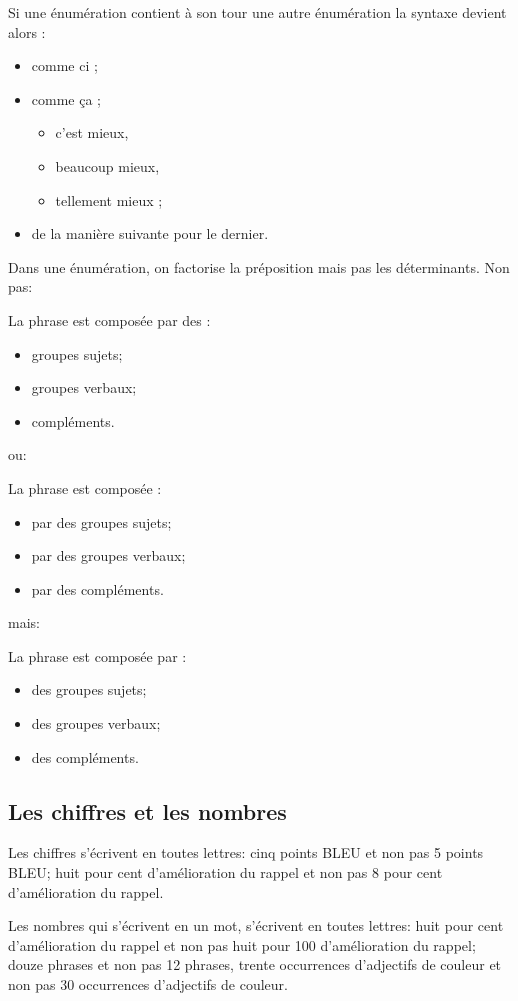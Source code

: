 \documentclass[utf8x]{article-hermes_frenchb}
\begin{document}
Si une énumération contient à son tour une autre énumération la syntaxe devient alors :
\begin{itemize}
\item comme ci ;
\item comme ça ;
    \begin{itemize}
	\item c'est mieux,
	\item beaucoup mieux,
	\item tellement mieux ;
    \end{itemize}
\item de la manière suivante pour le dernier.
\end{itemize}


Dans une énumération, on factorise la préposition mais pas les déterminants. Non pas:

La phrase est composée par des :
\begin{itemize}
\item groupes sujets;
\item groupes verbaux;
\item compléments. 
\end{itemize}

ou:

La phrase est composée :
\begin{itemize}
\item par des groupes sujets;
\item par des groupes verbaux;
\item par des compléments. 
\end{itemize}

mais:

La phrase est composée par :
\begin{itemize}
\item des groupes sujets;
\item des groupes verbaux;
\item des compléments. 
\end{itemize}

\subsection{Les chiffres et les nombres}

Les chiffres s'écrivent en toutes lettres:
cinq points BLEU
et non pas
5 points BLEU;
huit pour cent d'amélioration du rappel
et non pas
8 pour cent d'amélioration du rappel.

Les nombres qui s'écrivent en un mot, s'écrivent en toutes lettres:
huit pour cent d'amélioration du rappel
et non pas
huit pour 100 d'amélioration du rappel;
douze phrases
et non pas
12 phrases,
trente occurrences d'adjectifs de couleur
et non pas
30 occurrences d'adjectifs de couleur.
\end{document}
